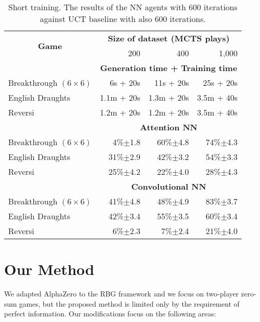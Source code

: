 \documentclass[letterpaper]{article} %
\begin{document}
\begin{table}[!ht]\small\centering\renewcommand{\arraystretch}{1.1}\setlength\tabcolsep{4.9pt}
\newcommand{\cb}[1]{{\scriptsize $\pm$#1}}%
\begin{tabular}{|l|r|r|r|}\hline
\multicolumn{1}{|c|}{\multirow{2}{*}{\bf Game}} & \multicolumn{3}{c|}{\bf Size of dataset (MCTS plays)} \\
& 200 & 400 & 1,000 \\\hline
& \multicolumn{3}{c|}{\bf Generation time + Training time} \\
Breakthrough $(6\times6)$ & 6s   + 20s &  11s + 20s & 25s + 20s \\
English Draughts          & 1.1m + 20s & 1.3m + 20s & 3.5m + 40s \\
Reversi                   & 1.2m + 20s & 1.2m + 20s & 3.5m + 40s \\\hline
& \multicolumn{3}{c|}{\bf Attention NN} \\
Breakthrough $(6\times6)$ & 4\%\cb{1.8} & 60\%\cb{4.8} & 74\%\cb{4.3} \\
English Draughts          & 31\%\cb{2.9} & 42\%\cb{3.2} & 54\%\cb{3.3} \\
Reversi                   & 25\%\cb{4.2} & 22\%\cb{4.0} & 28\%\cb{4.3} \\\hline
& \multicolumn{3}{c|}{\bf Convolutional NN} \\
Breakthrough $(6\times6)$ & 41\%\cb{4.8} & 48\%\cb{4.9} & 83\%\cb{3.7} \\
English Draughts          & 42\%\cb{3.4} & 55\%\cb{3.5} & 60\%\cb{3.4} \\
Reversi                   & 6\%\cb{2.3} & 7\%\cb{2.4} & 21\%\cb{4.0} \\\hline

\end{tabular}
\vspace{-0.72mm}
\caption{Short training. The results of the NN agents with 600 iterations against UCT baseline with also 600 iterations.} \label{tab:fast}
\end{table}

\section{Our Method}

We adapted AlphaZero to the RBG framework and we focus on two-player zero-sum games, but the proposed method is limited only by the requirement of perfect information.
Our modifications focus on the following areas:
\end{document}
